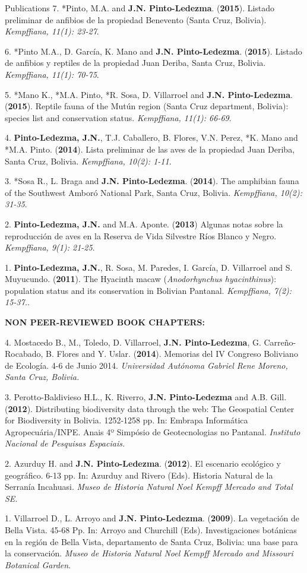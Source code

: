 \documentclass{resume} %
\begin{document}
\begin{rSection}{Publications}
{7.} {*Pinto, M.A. and} {\bf{J.N. Pinto-Ledezma}}. {({{\bf 2015}}). Listado preliminar de anfibios de la propiedad Benevento (Santa Cruz, Bolivia).} {\em Kempffiana, 11(1): 23-27}.

{6.} {*Pinto M.A., D. García, K. Mano and} {\bf{J.N. Pinto-Ledezma}}. {({{\bf 2015}}). Listado de anfibios y reptiles de la propiedad Juan Deriba, Santa Cruz, Bolivia.} {\em Kempffiana, 11(1): 70-75}.

{5.} {*Mano K., *M.A. Pinto, *R. Sosa, D. Villarroel and} {\bf{J.N. Pinto-Ledezma}}. {({{\bf 2015}}). Reptile fauna of the Mutún region (Santa Cruz department, Bolivia): species list and conservation status.} {\em Kempffiana, 11(1): 66-69}.

{4.} {\bf{Pinto-Ledezma, J.N.}}, {T.J. Caballero, B. Flores, V.N. Perez, *K. Mano and *M.A. Pinto. ({{\bf 2014}}). Lista preliminar de las aves de la propiedad Juan Deriba, Santa Cruz, Bolivia.} {\em Kempffiana, 10(2): 1-11}.

{3.} {*Sosa R., L. Braga and} {\bf{J.N. Pinto-Ledezma}}. {({{\bf 2014}}). The amphibian fauna of the Southwest Amboró National Park, Santa Cruz, Bolivia.} {\em Kempffiana, 10(2): 31-35}.

{2.} {\bf{Pinto-Ledezma, J.N.}} {and M.A. Aponte. ({{\bf 2013}}) Algunas notas sobre la reproducción de aves en la Reserva de Vida Silvestre Ríos Blanco y Negro.} {\em Kempffiana, 9(1): 21-25}.

{1.} {\bf{Pinto-Ledezma, J.N.}}, {R. Sosa, M. Paredes, I. García, D. Villarroel and S. Muyucundo. ({{\bf 2011}}). The Hyacinth macaw ({\em Anodorhynchus hyacinthinus}): population status and its conservation in Bolivian Pantanal.} {\em Kempffiana, 7(2): 15-37.}. 

{\bf NON PEER-REVIEWED BOOK CHAPTERS:}

{4.} {Mostacedo B., M., Toledo, D. Villarroel,} {\bf{J.N. Pinto-Ledezma}}, G. Carreño-Rocabado, B. Flores and Y. Uslar. ({{\bf 2014}}). Memorias del IV Congreso Boliviano de Ecología. 4-6 de Junio 2014. {\em Universidad Autónoma Gabriel Rene Moreno, Santa Cruz, Bolivia.}

{3.} {Perotto-Baldivieso H.L., K. Riverro, } {\bf{J.N. Pinto-Ledezma}} {and A.B. Gill. ({{\bf 2012}}). Distributing biodiversity data through the web: The Geospatial Center for Biodiversity in Bolivia. 1252-1258 pp. In: Embrapa Informática Agropecuária/INPE. Anais 4º Simpósio de Geotecnologias no Pantanal.} {\em Instituto Nacional de Pesquisas Espaciais.} 

{2.} {Azurduy H. and} {\bf{J.N. Pinto-Ledezma}}. {({{\bf 2012}}). El escenario ecológico y geográfico. 6-13 pp. In: Azurduy and Rivero (Eds). Historia Natural de la Serranía Incahuasi.} {\em Museo de Historia Natural Noel Kempff Mercado and Total SE}.

{1.} {Villarroel D., L. Arroyo and} {\bf{J.N. Pinto-Ledezma}}. {({{\bf 2009}}). La vegetación de Bella Vista. 45-68 Pp. In: Arroyo and Churchill (Eds). Investigaciones botánicas en la región de Bella Vista, departamento de Santa Cruz, Bolivia: una base para la conservación.} {\em Museo de Historia Natural Noel Kempff Mercado and Missouri Botanical Garden}. 

\end{rSection}
\end{document}

